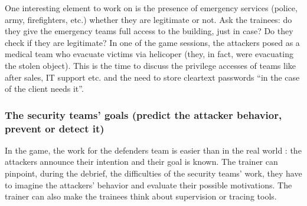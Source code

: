 \documentclass[11pt]{article} %
\begin{document}
One interesting element to work on is the presence of emergency services (police, 
army, firefighters, etc.) whether they are legitimate or not. Ask the trainees: 
do they give the emergency teams full access to the building, just in case? Do they check if they 
are legitimate? In one of the game sessions, the attackers
posed as a medical team who evacuate victims via helicoper (they, in fact, were 
evacuating the stolen object). This is the time to discuss the privilege accesses 
of teams like after sales, IT support etc. and the need to store cleartext passwords 
``in the case of the client needs it''.

\subsubsection{The security teams' goals (predict the attacker behavior, 
prevent or detect it)}
In the game, the work for the defenders team is easier than in the real world : 
the attackers announce their intention and their goal is known. The trainer can pinpoint, 
during the debrief, the difficulties of the security teams' work, they have to imagine the 
attackers' behavior and evaluate their possible motivations.
The trainer can also make the trainees think about supervision or tracing tools. 
\end{document}
